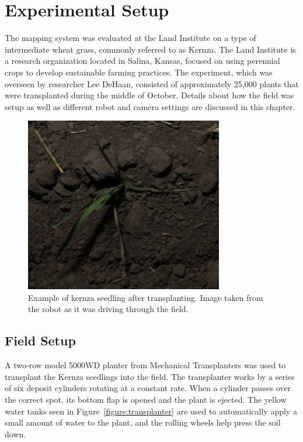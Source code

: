 
\cleardoublepage

\chapter{Experimental Setup}
\label{chapter:experiment}

The mapping system was evaluated at the Land Institute on a type of intermediate wheat grass, commonly referred to as Kernza.  The Land Institute is a research organization located in Salina, Kansas, focused on using perennial crops to develop sustainable farming practices.  The experiment, which was overseen by researcher Lee DeHaan, consisted of approximately 25,000 plants that were transplanted during the middle of October.  Details about how the field was setup as well as different robot and camera settings are discussed in this chapter. 

\begin{figure}
	\centering
    \includegraphics[height=3in]{figures/kernza_example.jpg}
    \caption[Kernza seedling]{Example of kernza seedling after transplanting. Image taken from the robot as it was driving through the field.}
    \label{figure:kernza_example}
\end{figure}

\section{Field Setup}
\label{section:field_setup}

A two-row model 5000WD planter from Mechanical Transplanters was used to transplant the Kernza seedlings into the field.  The transplanter works by a series of six deposit cylinders rotating at a constant rate.  When a cylinder passes over the correct spot, its bottom flap is opened and the plant is ejected.  The yellow water tanks seen in Figure~\ref{figure:transplanter} are used to automatically apply a small amount of water to the plant, and the rolling wheels help press the soil down.  

